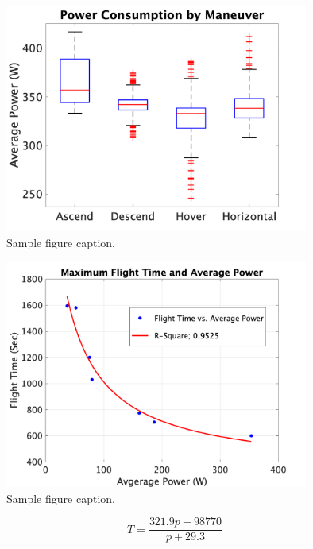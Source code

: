 \documentclass{article}
\begin{document}
\begin{figure}[!h]
  \centering
  \includegraphics[width = 100mm]{images/powerfinal.png}
  \caption{Sample figure caption.}
  \label{fig:fig1}
\end{figure}

\begin{figure}
  \centering
  \includegraphics[width = 100mm]{images/FlightTime.png}
  \caption{Sample figure caption.}
  \label{fig:fig1}
\end{figure}

\begin{equation}
T={\frac {321.9p + 98770}{p + 29.3}}
\end{equation}
\end{document}
